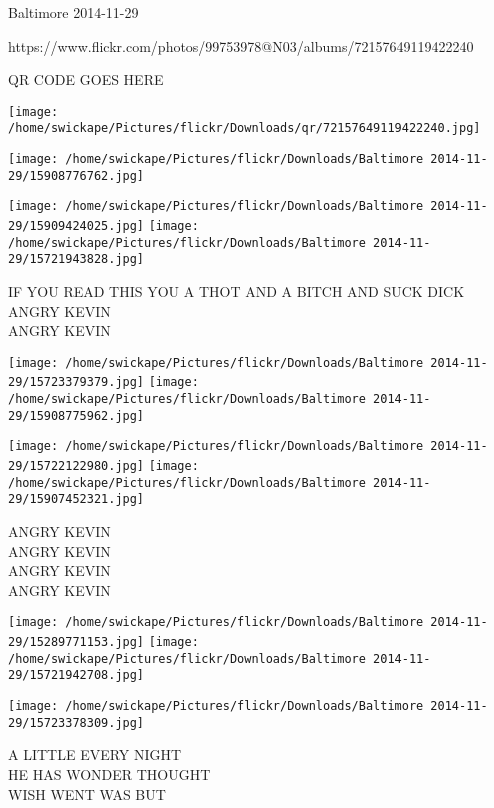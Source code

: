 \documentclass[10pt,letterpaper]{article}
\begin{document}
Baltimore 2014-11-29

https://www.flickr.com/photos/99753978@N03/albums/72157649119422240

QR CODE GOES HERE

\texttt{[image: /home/swickape/Pictures/flickr/Downloads/qr/72157649119422240.jpg]}
\pagebreak

\texttt{[image: /home/swickape/Pictures/flickr/Downloads/Baltimore 2014-11-29/15908776762.jpg]}

\vspace{0.25in}
\texttt{[image: /home/swickape/Pictures/flickr/Downloads/Baltimore 2014-11-29/15909424025.jpg]}
\texttt{[image: /home/swickape/Pictures/flickr/Downloads/Baltimore 2014-11-29/15721943828.jpg]}

IF YOU READ THIS YOU A THOT AND A BITCH AND SUCK DICK\\
ANGRY KEVIN\\
ANGRY KEVIN\\
\pagebreak

\texttt{[image: /home/swickape/Pictures/flickr/Downloads/Baltimore 2014-11-29/15723379379.jpg]}
\texttt{[image: /home/swickape/Pictures/flickr/Downloads/Baltimore 2014-11-29/15908775962.jpg]}

\texttt{[image: /home/swickape/Pictures/flickr/Downloads/Baltimore 2014-11-29/15722122980.jpg]}
\texttt{[image: /home/swickape/Pictures/flickr/Downloads/Baltimore 2014-11-29/15907452321.jpg]}

ANGRY KEVIN\\
ANGRY KEVIN\\
ANGRY KEVIN\\
ANGRY KEVIN\\
\pagebreak

\texttt{[image: /home/swickape/Pictures/flickr/Downloads/Baltimore 2014-11-29/15289771153.jpg]}
\texttt{[image: /home/swickape/Pictures/flickr/Downloads/Baltimore 2014-11-29/15721942708.jpg]}

\vspace{0.25in}
\texttt{[image: /home/swickape/Pictures/flickr/Downloads/Baltimore 2014-11-29/15723378309.jpg]}

A LITTLE EVERY NIGHT\\
HE HAS WONDER THOUGHT\\
WISH WENT WAS BUT\\
\pagebreak
\end{document}
